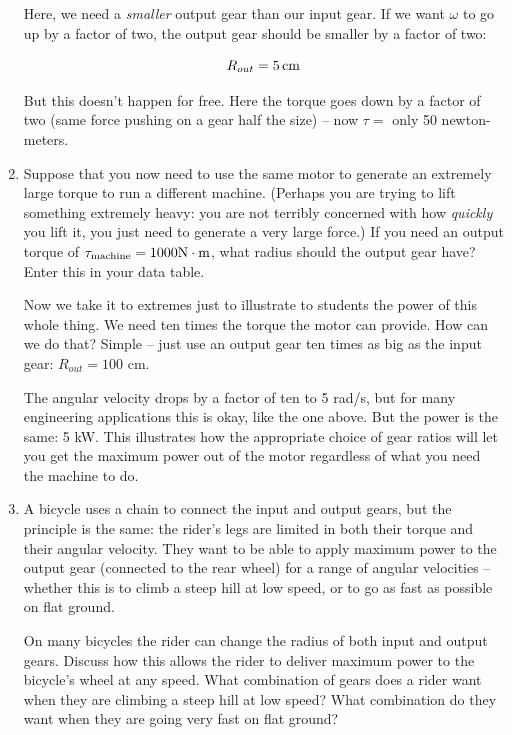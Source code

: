 \documentclass[12pt]{article}
\begin{document}
\begin{enumerate}
{\color{red}
	Here, we need a {\it smaller} output gear than our input gear. If we want $\omega$ to go up by a factor of two, the output gear should be smaller by a factor of two:
	
	$$R_{out} = 5\,\rm{cm}$$
	
	But this doesn't happen for free. Here the torque goes down by a factor of two (same force pushing on a gear half the size) -- now $\tau = $ only 50 newton-meters.
	
}

\vspace{2.5in}


\item Suppose that you now need to use the same motor to generate an extremely large torque to run a different machine. (Perhaps you are trying to lift something extremely heavy: you are not terribly concerned with how {\it quickly} you lift it, you just need to generate a very large force.) If you need an output torque of $\tau_{\rm{machine}} = 1000 \rm N \cdot \rm m$, what radius should the output gear have? Enter this in your data table.

{\color{red}
	Now we take it to extremes just to illustrate to students the power of this whole thing. We need ten times the torque the motor can provide. How can we do that? Simple -- just use an output gear ten times as big as the input gear: $R_{out} = 100$ cm. 
	
	The angular velocity drops by a factor of ten to 5 rad/s, but for many engineering applications this is okay, like the one above. But the power is the same: 5 kW. This illustrates how the appropriate choice of gear ratios will let you get the maximum power out of the motor regardless of what you need the machine to do.
	
}


\newpage


\item A bicycle uses a chain to connect the input and output gears, but the principle is the same: the rider's legs are limited in both their torque and their angular velocity. They want to be able to apply maximum power to the output gear (connected to the rear wheel) for a range of angular velocities -- whether this is to climb a steep hill at low speed, or to go as fast as possible on flat ground. 

On many bicycles the rider can change the radius of both input and output gears. Discuss how this allows the rider to deliver maximum power to the bicycle's wheel at any speed. What combination of gears does a rider want when they are climbing a steep hill at low speed? What combination do they want when they are going very fast on flat ground?


\end{enumerate}
\end{document}
